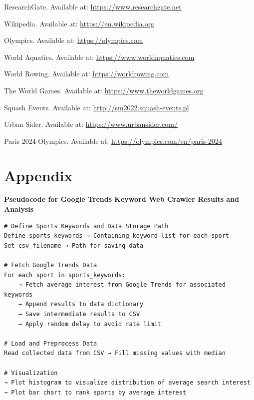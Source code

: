 \documentclass[12pt]{article}
\begin{document}
\begin{thebibliography}{99}
 ResearchGate. Available at: \url{https://www.researchgate.net}

 Wikipedia. Available at: \url{https://en.wikipedia.org}

 Olympics. Available at: \url{https://olympics.com}

 World Aquatics. Available at: \url{https://www.worldaquatics.com}

 World Rowing. Available at: \url{https://worldrowing.com}

 The World Games. Available at: \url{https://www.theworldgames.org}

 Squash Events. Available at: \url{http://sm2022.squash-events.pl}


 Urban Sider. Available at: \url{https://www.urbansider.com/}

 Paris 2024 Olympics. Available at: \url{https://olympics.com/en/paris-2024}

\end{thebibliography}

\section{Appendix}

\noindent \textbf{Pseudocode for Google Trends Keyword Web Crawler Results and Analysis}
\begin{Verbatim}[frame=lines, framesep=3mm, framerule=0.5pt]
# Define Sports Keywords and Data Storage Path
Define sports_keywords → Containing keyword list for each sport
Set csv_filename → Path for saving data

# Fetch Google Trends Data
For each sport in sports_keywords:
    → Fetch average interest from Google Trends for associated keywords
    → Append results to data dictionary
    → Save intermediate results to CSV
    → Apply random delay to avoid rate limit

# Load and Preprocess Data
Read collected data from CSV → Fill missing values with median

# Visualization
→ Plot histogram to visualize distribution of average search interest
→ Plot bar chart to rank sports by average interest
\end{Verbatim}
\end{document}
